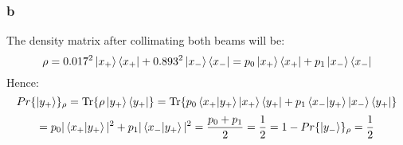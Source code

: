 \documentclass{article}
\begin{document}
\subsubsection{b}
The density matrix after collimating both beams will be:
$$\rho = 0.017^2\ket{x_+}\bra{x_+} + 0.893^2\ket{x_-}\bra{x_-} = p_0\ket{x_+}\bra{x_+} + p_1\ket{x_-}\bra{x_-}$$
Hence:
$$Pr\{\ket{y_+}\}_{\rho} = \Tr{\rho \ket{y_+}\bra{y_+}} = \Tr{p_0\braket{x_+}{y_+}\ket{x_+}\bra{y_+} + p_1\braket{x_-}{y_+}\ket{x_-}\bra{y_+}}$$
$$= p_0 |\braket{x_+}{y_+}|^2 + p_1 |\braket{x_-}{y_+}|^2 = \frac{p_0+p_1}{2} = \frac{1}{2} = 1 - Pr\{\ket{y_-}\}_{\rho} = \frac{1}{2}  $$
\end{document}

